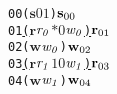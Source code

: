 \newcommand{\epsnd}{\textit{$N_s$}}
\newcommand{\eprcv}{\textit{$N_r$}}
\newcommand{\epwait}{\textit{$P_r$}}
\newcommand{\epbarrier}{\textit{$P_b$}}
\newcommand{\frm}{\textit{frm}}
\newcommand{\vbot}{\textit{v$-\bot$}}
\newcommand{\status}{\textit{s}}
\newcommand{\error}{\ensuremath{\mathbf{error}}}
\newcommand{\aidmap}{\textit{A}}
\newcommand{\thread}{\ensuremath{\mathit{p}}}
\newcommand{\aid}{\ensuremath{\mathit{x}}}
\newcommand{\num}{\ensuremath{\mathit{v}}}
\newcommand{\rcvp}{\ensuremath{\mathit{pt}}}
\newcommand{\npro}{\ensuremath{\mathit{n}}}
\newcommand{\cmd}{\ensuremath{\mathit{e}}}
\newcommand{\op}{\ensuremath{\mathit{op}}}
\newcommand{\comm}{\ensuremath{\mathit{cm}}}
\newcommand{\applyop}{\ensuremath{\mathrm{op}}}
\newcommand{\wait}{\ensuremath{\mathbf{w}}}
\newcommand{\sendi}{\ensuremath{\mathbf{s}}}
\newcommand{\recvi}{\ensuremath{\mathbf{r}}}
\newcommand{\barrier}{\ensuremath{\mathbf{b}}}
\newcommand{\traceentry}{\ensuremath{\sigma}}
\newcommand{\movelist}{\ensuremath{\delta}}
\newcommand{\ep}{\ensuremath{\mathbf{\gamma}}}
\newcommand{\src}{\ensuremath{\alpha}}
\newcommand{\dst}{\ensuremath{\beta}}
\newcommand{\true}{\ensuremath{\mathbf{true}}}
\newcommand{\false}{\ensuremath{\mathbf{false}}}
\newcommand{\match}{\ensuremath{\mathrm{m}}}
\newcommand{\matchl}{\ensuremath{\mathrm{match}}}
\newcommand{\findrecv}{\ensuremath{\mathrm{search_r}}}
\newcommand{\smt}{\ensuremath{\mathit{smt}}}

\newcommand{\statuschange}{\left\{ \begin{array}{ll}  \status &\ \mathrm{if}\ |\epsnd(\dst)(\src)|>0\\
   \mathit{error} &\  \mathrm{otherwise}\end{array}\right .}

\newcommand{\reduce}[1]{\ensuremath{\rightarrow_{#1}}}
\newcommand{\reduceK}[1]{\ensuremath{\rightarrow_{#1}^{*}}}
\newcommand{\reduceN}[1]{\ensuremath{\dashrightarrow_{#1}}}
\newcommand{\reduceNK}[1]{\ensuremath{\dashrightarrow_{#1}^{*}}}
\newcommand{\mt}{\ensuremath{mt}}
\newcommand{\trace}{\ensuremath{\mathit{trace}}}
\newcommand{\movebot}{\ensuremath{\mathit{m}}}
\newcommand{\ret}{\ensuremath{\mathbf{ret}}}


\newsavebox{\boxTZero}
\begin{lrbox}{\boxTZero}
\begin{minipage}[t]{0.65\linewidth}
\large
\begin{alltt}
00 (\(\mathbf{s}\) \(\mathit{0 1}\)) \(\mathbf{s}\sb{00}\)
01 \underline{(\(\mathbf{r}\) \(\mathit{r\sb{0}}\) \(\mathit{\ast 0}\) \(\mathit{w\sb{0}}\)) \(\mathbf{r}\sb{01}\)}
02 (\(\mathbf{w}\) \(\mathit{w\sb{0}}\)) \(\mathbf{w}\sb{02}\)
03 \underline{(\(\mathbf{r}\) \(\mathit{r\sb{1}}\) \(\mathit{1 0}\) \(\mathit{w\sb{1}}\)) \(\mathbf{r}\sb{03}\)}
04 (\(\mathbf{w}\) \(\mathit{w\sb{1}}\)) \(\mathbf{w}\sb{04}\)
\end{alltt}
\end{minipage}
\end{lrbox}

